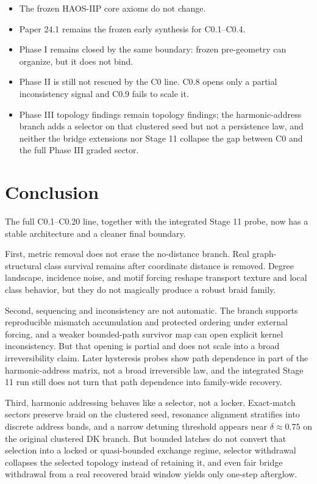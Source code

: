 \documentclass[11pt]{article}
\begin{document}
\begin{itemize}
\item The frozen HAOS-IIP core axioms do not change.
\item Paper 24.1 remains the frozen early synthesis for C0.1--C0.4.
\item Phase I remains closed by the same boundary: frozen pre-geometry can organize, but it does not bind.
\item Phase II is still not rescued by the C0 line. C0.8 opens only a partial inconsistency signal and C0.9 fails to scale it.
\item Phase III topology findings remain topology findings; the harmonic-address branch adds a selector on that clustered seed but not a persistence law, and neither the bridge extensions nor Stage 11 collapse the gap between C0 and the full Phase III graded sector.
\end{itemize}

\section{Conclusion}

The full C0.1--C0.20 line, together with the integrated Stage 11 probe, now has a stable architecture and a cleaner final boundary.

First, metric removal does not erase the no-distance branch. Real graph-structural class survival remains after coordinate distance is removed. Degree landscape, incidence noise, and motif forcing reshape transport texture and local class behavior, but they do not magically produce a robust braid family.

Second, sequencing and inconsistency are not automatic. The branch supports reproducible mismatch accumulation and protected ordering under external forcing, and a weaker bounded-path survivor map can open explicit kernel inconsistency. But that opening is partial and does not scale into a broad irreversibility claim. Later hysteresis probes show path dependence in part of the harmonic-address matrix, not a broad irreversible law, and the integrated Stage 11 run still does not turn that path dependence into family-wide recovery.

Third, harmonic addressing behaves like a selector, not a locker. Exact-match sectors preserve braid on the clustered seed, resonance alignment stratifies into discrete address bands, and a narrow detuning threshold appears near $\delta \approx 0.75$ on the original clustered DK branch. But bounded latches do not convert that selection into a locked or quasi-bounded exchange regime, selector withdrawal collapses the selected topology instead of retaining it, and even fair bridge withdrawal from a real recovered braid window yields only one-step afterglow.
\end{document}
